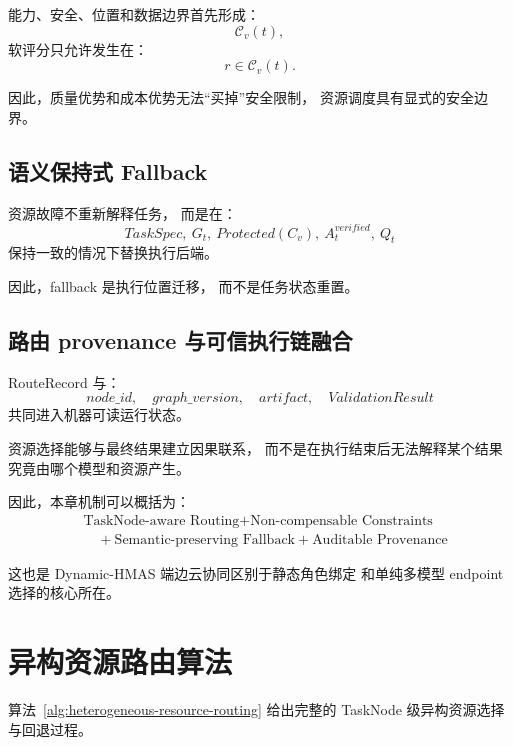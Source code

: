 \documentclass[UTF8,a4paper,12pt,oneside]{ctexbook}
\begin{document}
能力、安全、位置和数据边界首先形成：
\[
\mathcal{C}_v(t),
\]
软评分只允许发生在：
\[
r\in\mathcal{C}_v(t).
\]

因此，质量优势和成本优势无法“买掉”安全限制，
资源调度具有显式的安全边界。


\subsection{语义保持式 Fallback}

资源故障不重新解释任务，
而是在：
\[
TaskSpec,\ G_t,\ Protected(C_v),\ A_t^{verified},\ Q_t
\]
保持一致的情况下替换执行后端。

因此，fallback 是执行位置迁移，
而不是任务状态重置。


\subsection{路由 provenance 与可信执行链融合}

RouteRecord 与：
\[
node\_id,
\quad
graph\_version,
\quad
artifact,
\quad
ValidationResult
\]
共同进入机器可读运行状态。

资源选择能够与最终结果建立因果联系，
而不是在执行结束后无法解释某个结果究竟由哪个模型和资源产生。

因此，本章机制可以概括为：
\[
\boxed{
\begin{aligned}
&\text{TaskNode-aware Routing}
+ \text{Non-compensable Constraints} \\[3pt]
&\quad {}+ \text{Semantic-preserving Fallback}
+ \text{Auditable Provenance}
\end{aligned}
}
\]

这也是 Dynamic-HMAS 端边云协同区别于静态角色绑定
和单纯多模型 endpoint 选择的核心所在。


\section{异构资源路由算法}

算法~\ref{alg:heterogeneous-resource-routing}
给出完整的 TaskNode 级异构资源选择与回退过程。
\end{document}
